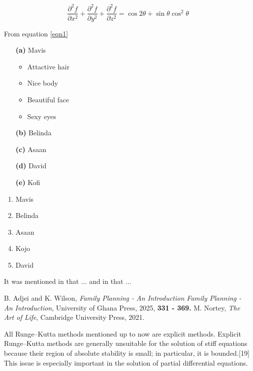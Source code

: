 \documentclass[12pt]{article}
\begin{document}
\begin{equation*}\tag{Belinda}\label{eqn1}
\frac{\partial^2f}{\partial x^2} + \frac{\partial^2f}{\partial  y^2} + \frac{\partial^2f}{\partial z^2} = \cos 2\theta + \sin  \theta \cos^2\theta 
\end{equation*}

From equation \ref{eqn1}

\newpage

\begin{itemize}
\item[\textbf{(a)}] Mavis
\begin{itemize}
\item Attactive hair
\item Nice body
\item Beautiful face
\item Sexy eyes
\end{itemize}
\item[\textbf{(b)}] Belinda
\item[\textbf{(c)}] Asaan
\item[\textbf{(d)}] David
\item[\textbf{(e)}] Kofi
\end{itemize}

\vspace{1cm}

\begin{enumerate}
\item Mavis
\item Belinda
\item Asaan
\item Kojo
\item David
\end{enumerate}

It was mentioned in \cite{MN2021} that ... and in \cite{BAKW2025} that ...

\begin{thebibliography}{99}
 B. Adjei and K. Wilson,
         {\em{Family Planning - An Introduction} Family Planning - An Introduction},
         University of Ghana Press,
         2025,
         \textbf{331 - 369.} 
 M. Nortey, 
         {\em The Art of Life}, 
         Cambridge University Press,
         2021.
\end{thebibliography}

All Runge–Kutta methods mentioned up to now are explicit methods. Explicit Runge–Kutta methods are generally unsuitable for the solution of stiff equations because their region of absolute stability is small; in particular, it is bounded.[19] This issue is especially important in the solution of partial differential equations.
\end{document}
